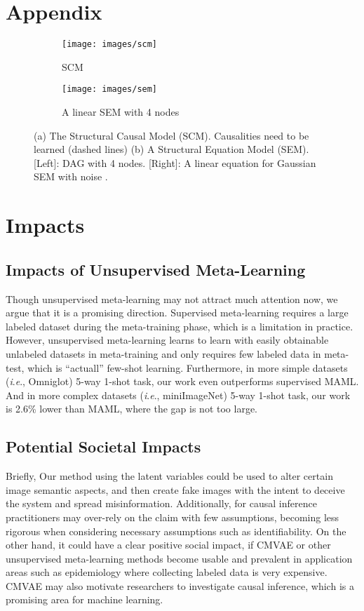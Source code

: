 \documentclass[letterpaper]{article} \usepackage{aaai23}  \usepackage{times}  \usepackage{helvet}  \usepackage{courier}  \usepackage[hyphens]{url}  \usepackage{graphicx} \urlstyle{rm} \def\UrlFont{\rm}  \usepackage{natbib}  \usepackage{caption} \frenchspacing  \setlength{\pdfpagewidth}{8.5in}  \setlength{\pdfpageheight}{11in}  \usepackage{algorithm}
\newcommand{\ie}{\textit{i}.\textit{e}.}
\theoremstyle{plain}
\theoremstyle{definition}
\theoremstyle{remark}
\begin{document}




\newpage
\appendix

\section*{Appendix}

	\begin{figure*}[!h]
	\centering
	\begin{subfigure}[t]{.25\textwidth}
		\centering
		\texttt{[image: images/scm]}
		\caption{SCM}
		\label{fig:scm}
	\end{subfigure}
	\hfill
	\begin{subfigure}[t]{.55\textwidth}
		\centering
		\texttt{[image: images/sem]}
		\caption{A linear SEM with 4 nodes}
		\label{fig:sem}
	\end{subfigure}	
	\caption{(a) The Structural Causal Model (SCM). Causalities need to be learned  (dashed lines)  (b) A Structural Equation Model (SEM). [Left]:  DAG with 4 nodes. [Right]: A linear equation for Gaussian SEM with noise .}
	\label{fig:ifsl__}
\end{figure*}

\section{Impacts} 
\subsection{Impacts of Unsupervised Meta-Learning}
Though unsupervised meta-learning may not attract much attention now, we argue that it is a promising direction. Supervised meta-learning requires a large labeled dataset during the meta-training phase, which is a limitation in practice. However, unsupervised meta-learning learns to learn with easily obtainable unlabeled datasets in meta-training and only requires few labeled data in meta-test, which is ``actuall'' few-shot learning. Furthermore, in more simple datasets (\ie, Omniglot) 5-way 1-shot task, our work even outperforms supervised MAML. And in more complex datasets (\ie, miniImageNet) 5-way 1-shot task, our work is 2.6\% lower than MAML, where the gap is not too large.


\subsection{Potential Societal Impacts}
Briefly, Our method using the latent variables could be used to alter certain image semantic aspects, and then create fake images with the intent to deceive the system and spread misinformation. Additionally, for causal inference practitioners may over-rely on the claim with few assumptions, becoming less rigorous when considering necessary assumptions such as identifiability. On the other hand, it could have a clear positive social impact, if CMVAE or other unsupervised meta-learning methods become usable and prevalent in application areas such as epidemiology where collecting labeled data is very expensive. CMVAE may also motivate researchers to investigate causal inference, which is a promising area for machine learning.
\end{document}

